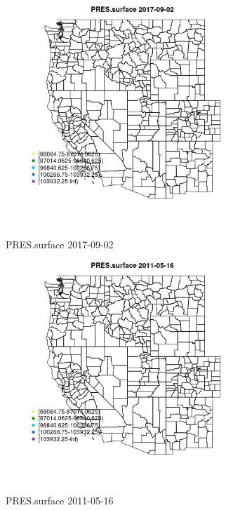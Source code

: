 \begin{figure} 
\centering  
\includegraphics[width=0.77\textwidth]{Code_Outputs/Report_ML_input_PM25_Step4_part_e_de_duplicated_aveswNAs_MapObsPRESsurface2017-09-02.jpg} 
\caption{\label{fig:Report_ML_input_PM25_Step4_part_e_de_duplicated_aveswNAsMapObsPRESsurface2017-09-02}PRES.surface 2017-09-02} 
\end{figure} 
 

\begin{figure} 
\centering  
\includegraphics[width=0.77\textwidth]{Code_Outputs/Report_ML_input_PM25_Step4_part_e_de_duplicated_aveswNAs_MapObsPRESsurface2011-05-16.jpg} 
\caption{\label{fig:Report_ML_input_PM25_Step4_part_e_de_duplicated_aveswNAsMapObsPRESsurface2011-05-16}PRES.surface 2011-05-16} 
\end{figure} 
 

